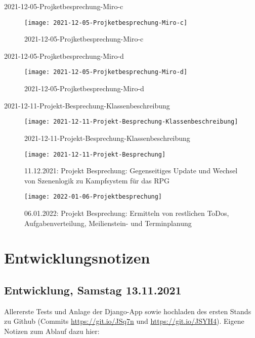 2021-12-05-Projketbesprechung-Miro-c 
\begin{figure}[H]
    \centering
    \caption[]{2021-12-05-Projketbesprechung-Miro-c}
    \label{fig:2021-12-05-Projketbesprechung-Miro-c}
    \texttt{[image: 2021-12-05-Projketbesprechung-Miro-c]}
\end{figure}

2021-12-05-Projketbesprechung-Miro-d 
\begin{figure}[H]
    \centering
    \caption[]{2021-12-05-Projketbesprechung-Miro-d}
    \label{fig:2021-12-05-Projketbesprechung-Miro-d}
    \texttt{[image: 2021-12-05-Projketbesprechung-Miro-d]}
\end{figure}

2021-12-11-Projekt-Besprechung-Klassenbeschreibung 
\begin{figure}[H]
    \centering
    \caption[]{2021-12-11-Projekt-Besprechung-Klassenbeschreibung}
    \label{fig:2021-12-11-Projekt-Besprechung-Klassenbeschreibung}
    \texttt{[image: 2021-12-11-Projekt-Besprechung-Klassenbeschreibung]}
\end{figure}


\begin{figure}[H]
    \centering
    \caption[]{11.12.2021: Projekt Besprechung: Gegenseitiges Update und Wechsel von Szenenlogik zu Kampfsystem für das RPG }
    \label{fig:2021-12-11-Projekt-Besprechung}
    \texttt{[image: 2021-12-11-Projekt-Besprechung]}
\end{figure}


\begin{figure}[H]
    \centering
    \caption[]{06.01.2022: Projekt Besprechung: Ermitteln von restlichen ToDos, Aufgabenverteilung, Meilienstein- und Terminplanung}
    \label{fig:2022-01-06-Projektbesprechung}
    \texttt{[image: 2022-01-06-Projektbesprechung]}
\end{figure}




\section{Entwicklungsnotizen}


\subsection{Entwicklung, Samstag 13.11.2021}

Allererste Tests und Anlage der Django-App sowie  hochladen des ersten Stands zu Github (Commits \url{https://git.io/JSq7n} und \url{https://git.io/JSYH4}). Eigene Notizen zum Ablauf dazu hier: 


